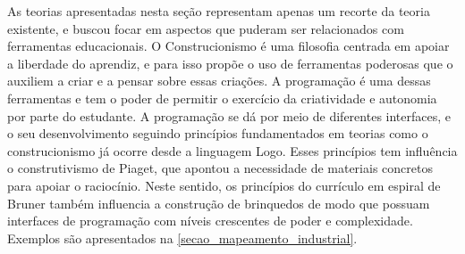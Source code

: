 As teorias apresentadas nesta seção representam apenas um recorte da teoria existente, e buscou focar em aspectos que puderam ser relacionados com ferramentas educacionais. O Construcionismo é uma filosofia centrada em apoiar a liberdade do aprendiz, e para isso propõe o uso de ferramentas poderosas que o auxiliem a criar e a pensar sobre essas criações. A programação é uma dessas ferramentas e tem o poder de permitir o exercício da criatividade e autonomia por parte do estudante. A programação se dá por meio de diferentes interfaces, e o seu desenvolvimento seguindo princípios fundamentados em teorias como o construcionismo já ocorre desde a linguagem Logo. Esses princípios tem influência o construtivismo de Piaget, que apontou a necessidade de materiais concretos para apoiar o raciocínio. Neste sentido, os princípios do currículo em espiral de Bruner também influencia a construção de brinquedos de modo que possuam interfaces de programação com níveis crescentes de poder e complexidade. Exemplos são apresentados na \autoref{secao_mapeamento_industrial}. 



